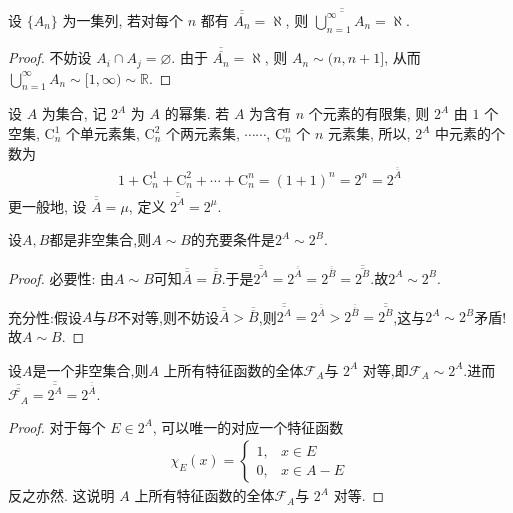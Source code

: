 \documentclass[../../main.tex]{subfiles}
\begin{document}
\begin{theorem}
设 $\{A_n\}$ 为一集列, 若对每个 $n$ 都有 $\overline{\overline{A_n}} = \aleph$, 则 $\overline{\overline{\bigcup_{n = 1}^{\infty} A_n}} = \aleph$.
\end{theorem}
\begin{proof}
不妨设 $A_i \cap A_j = \varnothing$. 由于 $\overline{\overline{A_n}} = \aleph$, 则 $A_n \sim (n, n + 1]$, 从而 $\bigcup_{n = 1}^{\infty} A_n \sim [1, \infty) \sim \mathbb{R}$.
\end{proof}

\begin{definition}
设 $A$ 为集合, 记 $2^A$ 为 $A$ 的幂集. 若 $A$ 为含有 $n$ 个元素的有限集, 则 $2^A$ 由 $1$ 个空集, $\mathrm{C}_{n}^1$ 个单元素集, $\mathrm{C}_{n}^2$ 个两元素集, $\cdots\cdots$, $\mathrm{C}_{n}^n$ 个 $n$ 元素集, 所以, $2^A$ 中元素的个数为
\begin{align*}
1 + \mathrm{C}_{n}^1 + \mathrm{C}_{n}^2 + \cdots + \mathrm{C}_{n}^n = (1 + 1)^n = 2^n = 2^{\overline{\overline{A}}}
\end{align*}
更一般地, 设 $\overline{\overline{A}} = \mu$, 定义 $\overline{\overline{2^A}} = 2^{\mu}$.
\end{definition}

\begin{proposition}\label{proposition:两集合对等的充要条件是幂集也对等}
设$A,B$都是非空集合,则$A\sim B$的充要条件是$2^A\sim 2^B$.
\end{proposition}
\begin{proof}
必要性:
由$A\sim B$可知$\overline{\overline{A}}=\overline{\overline{B}}$.于是$\overline{\overline{2^A}}=2^{\overline{\overline{A}}}=2^{\overline{\overline{B}}}=\overline{\overline{2^B}}.$故$2^A\sim 2^B$.

充分性:假设$A$与$B$不对等,则不妨设$\overline{\overline{A}}>\overline{\overline{B}}$,则$\overline{\overline{2^A}}=2^{\overline{\overline{A}}}>2^{\overline{\overline{B}}}=\overline{\overline{2^B}}$,这与$2^A\sim 2^B$矛盾!故$A\sim B$.
\end{proof}

\begin{lemma}\label{lemma:2^A与A上所有特征函数全体对等}
设$A$是一个非空集合,则$A$ 上所有特征函数的全体$\mathcal{F}_{A}$与 $2^A$ 对等,即$\mathcal{F}_{A}\sim 2^A$.进而$\overline{\overline{\mathcal{F}_{A}}}=\overline{\overline{2^A}}=2^{\overline{\overline{A}}}.$
\end{lemma}
\begin{proof}
对于每个 $E \in 2^A$, 可以唯一的对应一个特征函数
\begin{align*}
\chi_E(x) = 
\begin{cases}
1, & x \in E\\
0, & x \in A - E
\end{cases}
\end{align*}
反之亦然. 这说明 $A$ 上所有特征函数的全体$\mathcal{F}_{A}$与 $2^A$ 对等. 
\end{proof}
\end{document}
